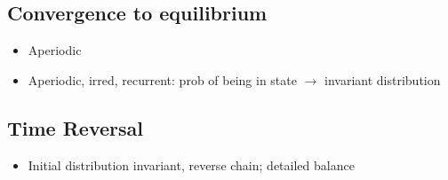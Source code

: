 \subsection*{Convergence to equilibrium}
\begin{itemize}
    \item Aperiodic
    \item Aperiodic, irred, recurrent: prob of being in state $\to$ invariant distribution
\end{itemize}
\subsection*{Time Reversal}
\begin{itemize}
    \item Initial distribution invariant, reverse chain; detailed balance
\end{itemize}
